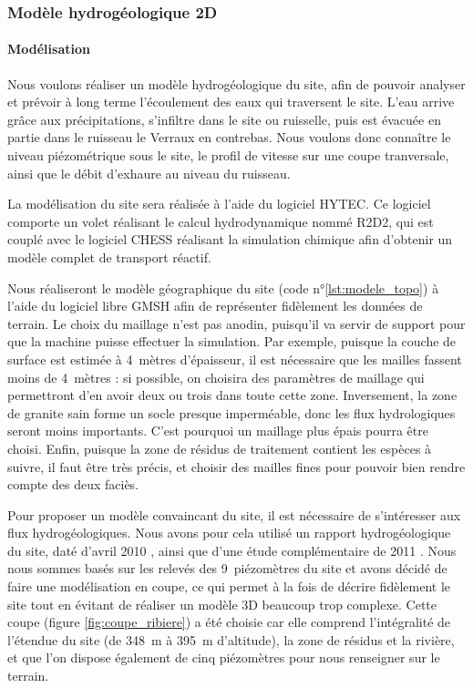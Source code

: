 \documentclass{article}
\begin{document}


\subsubsection{Modèle hydrogéologique 2D}
\paragraph{Modélisation}
Nous voulons réaliser un modèle hydrogéologique du site, afin de pouvoir analyser et prévoir à long terme l'écoulement des eaux qui traversent le site. L'eau arrive grâce aux précipitations, s'infiltre dans le site ou ruisselle, puis est évacuée en partie dans le ruisseau le Verraux en contrebas. Nous voulons donc connaître le niveau piézométrique sous le site, le profil de vitesse sur une coupe tranversale, ainsi que le débit d'exhaure au niveau du ruisseau.

La modélisation du site sera réalisée à l'aide du logiciel HYTEC. Ce logiciel comporte un volet réalisant le calcul hydrodynamique nommé R2D2, qui est couplé avec le logiciel CHESS réalisant la simulation chimique \cite{lagneau:hal-00614306} afin d'obtenir un modèle complet de transport réactif. 

Nous réaliseront le modèle géographique du site (code n°\ref{lst:modele_topo}) à l'aide du logiciel libre GMSH \cite{gmsh_site} afin de représenter fidèlement les données de terrain. Le choix du maillage n'est pas anodin, puisqu'il va servir de support pour que la machine puisse effectuer la simulation. Par exemple, puisque la couche de surface est estimée à 4~mètres d'épaisseur, il est nécessaire que les mailles fassent moins de 4~mètres : si possible, on choisira des paramètres de maillage qui permettront d'en avoir deux ou trois dans toute cette zone. Inversement, la zone de granite sain forme un socle presque imperméable, donc les flux hydrologiques seront moins importants. C'est pourquoi un maillage plus épais pourra être choisi. Enfin, puisque la zone de résidus de traitement contient les espèces à suivre, il faut être très précis, et choisir des mailles fines pour pouvoir bien rendre compte des deux faciès.

Pour proposer un modèle convaincant du site, il est nécessaire de s’intéresser aux flux hydrogéologiques. Nous avons pour cela utilisé un rapport hydrogéologique du site, daté d'avril 2010 \cite{societe_areva_nc_etude_2010}, ainsi que d'une étude complémentaire de 2011 \cite{societe_areva_nc_etude_2011}. Nous nous sommes basés sur les relevés des 9~piézomètres du site et avons décidé de faire une modélisation en coupe, ce qui permet à la fois de décrire fidèlement le site tout en évitant de réaliser un modèle 3D beaucoup trop complexe. Cette coupe (figure \ref{fig:coupe_ribiere}) a été choisie car elle comprend l'intégralité de l'étendue du site (de 348~m à 395~m d'altitude), la zone de résidus et la rivière, et que l'on dispose également de cinq piézomètres pour nous renseigner sur le terrain.
\end{document}
